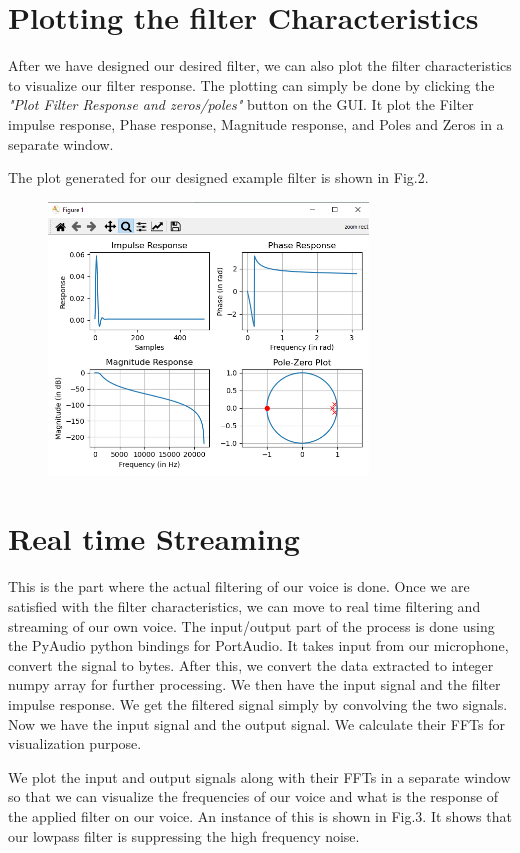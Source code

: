 \documentclass{article}
\begin{document}
\section{Plotting the filter Characteristics}
\label{sec:plotting}
After we have designed our desired filter, we can also plot the filter characteristics to visualize our filter response. The plotting can simply be done by clicking the \emph{"Plot Filter Response and zeros/poles"} button on the GUI. It plot the Filter impulse response, Phase response, Magnitude response, and Poles and Zeros in a separate window.

The plot generated for our designed example filter is shown in Fig.2.

\begin{figure}[htb]
\centering
  \centerline{\includegraphics[width=8.5cm]{3}}
\caption{}
\label{fig:fig2}
\end{figure}


\section{Real time Streaming}
\label{sec:stream}
This is the part where the actual filtering of our voice is done. Once we are satisfied with the filter characteristics, we can move to real time filtering and streaming of our own voice. The input/output part of the process is done using the PyAudio python bindings for PortAudio. It takes input from our microphone, convert the signal to bytes. After this, we convert the data extracted to integer numpy array for further processing. We then have the input signal and the filter impulse response. We get the filtered signal simply by convolving the two signals. Now we have the input signal and the output signal. We calculate their FFTs for visualization purpose.

We plot the input and output signals along with their FFTs in a separate window so that we can visualize the frequencies of our voice and what is the response of the applied filter on our voice. An instance of this is shown in Fig.3. It shows that our lowpass filter is suppressing the high frequency noise.
\end{document}
